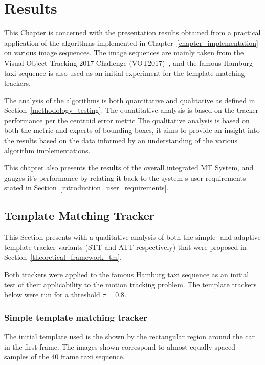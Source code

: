 \chapter{Results}\label{chapter_results}

This Chapter is concerned with the presentation results obtained from a practical
application of the algorithms implemented in
Chapter~\ref{chapter_implementation} on various image sequences. 
The image sequences are mainly taken from the Visual Object Tracking 2017
Challenge (VOT2017)~\cite{VOT2017}, and the famous Hamburg taxi sequence is also used as an
initial experiment for the template matching trackers.

The analysis of the algorithms is both quantitative and qualitative as defined
in Section~\ref{methodology_testing}. The
quantitative analysis is based on the tracker performance per the centroid error metric
The qualitative analysis is based on both the metric and experts of bounding
boxes, it aims to provide an insight into the results based on the data informed by
an understanding of the various algorithm implementations. 

This chapter also presents the results of the overall integrated MT System, and
gauges it's performance by relating it back to the system
s user requirements stated in Section~\ref{introduction_user_requirements}.


\section{Template Matching Tracker}
This Section presents with a qualitative analysis of both the simple- and
adaptive template tracker variants (STT and ATT respectively) that were proposed
in Section~\ref{theoretical_framework_tm}. 

Both trackers were applied to the famous Hamburg taxi sequence \cite{} as an initial
test of their applicability to the motion tracking problem.
The template trackers below were run for a threshold $\tau=0.8$.

\subsection{Simple template matching tracker}\label{results_simple_template_matching}
The initial template used is the shown by the rectangular region around the car
in the first frame. The images shown correspond to almost equally spaced
samples of the 40 frame taxi sequence.

